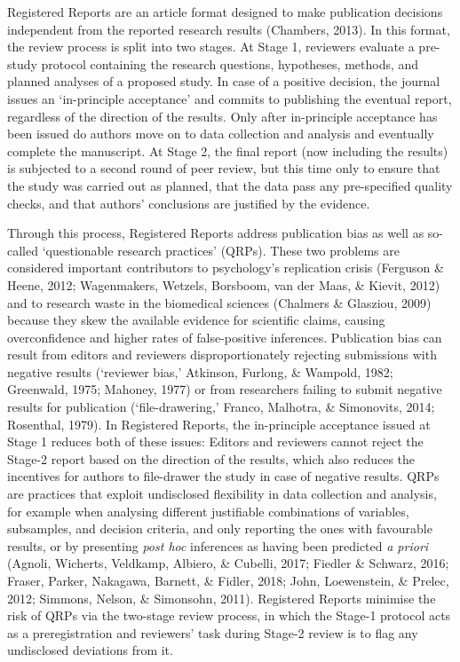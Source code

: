 \documentclass[
  ,man,mask,floatsintext]{apa6}
\begin{document}
Registered Reports are an article format designed to
make publication decisions independent from the reported research results
(Chambers, 2013).
In this format, the review process is split into two stages.
At Stage 1, reviewers evaluate a pre-study protocol containing the research questions, hypotheses, methods, and planned analyses of a proposed study.
In case of a positive decision, the journal issues an `in-principle acceptance' and commits to publishing the eventual report, regardless of the direction of the results.
Only after in-principle acceptance has been issued do authors move on to data collection and analysis and eventually complete the manuscript.
At Stage 2, the final report (now including the results) is subjected to a second round of peer review, but this time only to ensure that the study was carried out as planned, that the data pass any pre-specified quality checks, and that authors' conclusions are justified by the evidence.

Through this process, Registered Reports
address publication bias as well as so-called `questionable research practices' (QRPs).
These two problems are considered important contributors to psychology's replication crisis (Ferguson \& Heene, 2012; Wagenmakers, Wetzels, Borsboom, van der Maas, \& Kievit, 2012) and to research waste in the biomedical sciences (Chalmers \& Glasziou, 2009) because they skew the available evidence for scientific claims, causing overconfidence and higher rates of false-positive inferences.
Publication bias can result from editors and reviewers disproportionately rejecting submissions with negative results (`reviewer bias,' Atkinson, Furlong, \& Wampold, 1982; Greenwald, 1975; Mahoney, 1977) or from researchers failing to submit negative results for publication (`file-drawering,' Franco, Malhotra, \& Simonovits, 2014; Rosenthal, 1979).
In Registered Reports, the
in-principle acceptance issued at Stage 1 reduces both of these issues: Editors and reviewers cannot reject the Stage-2 report based on the direction of the results, which also reduces the incentives for authors to file-drawer the study in case of negative results.
QRPs are practices that exploit undisclosed flexibility in data collection and analysis, for example when analysing different justifiable combinations of variables, subsamples, and decision criteria, and only reporting the ones with favourable results, or by presenting \emph{post hoc} inferences as having been predicted \emph{a priori} (Agnoli, Wicherts, Veldkamp, Albiero, \& Cubelli, 2017; Fiedler \& Schwarz, 2016; Fraser, Parker, Nakagawa, Barnett, \& Fidler, 2018; John, Loewenstein, \& Prelec, 2012; Simmons, Nelson, \& Simonsohn, 2011).
Registered Reports minimise the risk of QRPs via the two-stage review process, in which the Stage-1 protocol acts as a preregistration and reviewers' task during Stage-2 review is to flag any undisclosed deviations from it.
\end{document}
